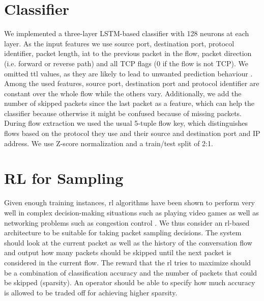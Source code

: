 \documentclass[conference]{IEEEtran}
\begin{document}
\section{Classifier}
\label{sec:classifier}
We implemented a three-layer LSTM-based classifier with 128 neurons at each layer. As the input features we use source port, destination port, protocol identifier, packet length, \gls{iat} to the previous packet in the flow, packet direction (i.e. forward or reverse path) and all TCP flags (0 if the flow is not TCP).
We omitted \gls{ttl} values, as they are likely to lead to unwanted prediction behaviour \cite{bachl_walling_2019}.  Among the used features, source port, destination port and protocol identifier are constant over the whole flow while the others vary.
Additionally, we add the number of skipped packets since the last packet as a feature, which can help the classifier because otherwise it might be confused because of missing packets. 
During flow extraction we used the usual 5-tuple flow key, which distinguishes flows based on the protocol they use and their source and destination port and IP address.
We use Z-score normalization and a train/test split of 2:1.

\section{RL for Sampling}
\label{sec:rlForSampling}
Given enough training instances, \gls{rl} algorithms have been shown to perform very well in complex decision-making situations such as playing video games \cite{mnih_playing_2013} as well as networking problems such as congestion control \cite{bachl_rax_2019}. We thus consider an \gls{rl}-based architecture to be suitable for taking packet sampling decisions. The system should look at the current packet as well as the history of the conversation flow and output how many packets should be skipped until the next packet is considered in the current flow. The reward that the \gls{rl} tries to maximize should be a combination of classification accuracy and the number of packets that could be skipped (sparsity). An operator should be able to specify how much accuracy is allowed to be traded off for achieving higher sparsity.%

\end{document}
